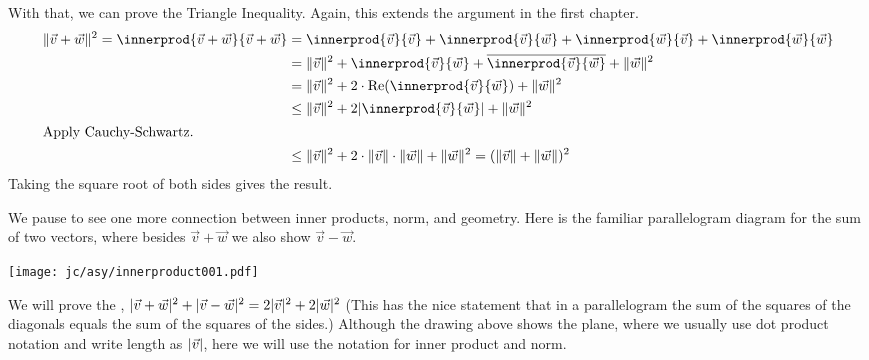 With that, we can prove the Triangle Inequality.
Again, this extends the argument in the first chapter.
\begin{align*}
  \norm{\vec{v}+\vec{w}}^2
  =\innerprod{\vec{v}+\vec{w}}{\vec{v}+\vec{w}}  
  &=\innerprod{\vec{v}}{\vec{v}}
    +\innerprod{\vec{v}}{\vec{w}}  
    +\innerprod{\vec{w}}{\vec{v}}  
    +\innerprod{\vec{w}}{\vec{w}}   \\ 
  &=\norm{\vec{v}}^2
    +\innerprod{\vec{v}}{\vec{w}}  
    +\compconj{\innerprod{\vec{v}}{\vec{w}}}  
    +\norm{\vec{w}}^2              \\   
  &=\norm{\vec{v}}^2
    +2\cdot\RE{\innerprod{\vec{v}}{\vec{w}}}  
    +\norm{\vec{w}}^2      \\
  &\leq\norm{\vec{v}}^2
    +2\absval{\innerprod{\vec{v}}{\vec{w}}}  
    +\norm{\vec{w}}^2     \\
\intertext{Apply Cauchy-Schwartz.}
  &\leq\norm{\vec{v}}^2
    +2\cdot\norm{\vec{v}}\cdot\norm{\vec{w}}
    +\norm{\vec{w}}^2      
  =(\norm{\vec{v}}+\norm{\vec{w}})^2         
\end{align*}
Taking the square root of both sides gives the result.

We pause to see one more connection between inner products, norm, and geometry.
Here is the familiar parallelogram diagram for the sum of two vectors,
where besides $\vec{v}+\vec{w}$ we also show $\vec{v}-\vec{w}$. 
\begin{center}
  \texttt{[image: jc/asy/innerproduct001.pdf]}
\end{center}
We will prove the 
,
$\lvert\vec{v}+\vec{w}\rvert^2+\lvert\vec{v}-\vec{w}\rvert^2=2\lvert\vec{v}\rvert^2+2\lvert\vec{w}\rvert^2$
(This has the nice statement that in a parallelogram the sum of the squares 
of the diagonals equals the sum of the squares of the sides.)
Although the drawing above shows the plane, where we usually use dot product 
notation and write length as $\lvert\vec{v}\rvert$, 
here we will use the notation for inner product and norm.

